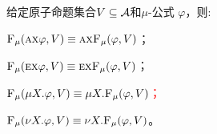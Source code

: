 \begin{proposition}[同质性]\label{chapter06:pro:mu:forget:2}
	给定原子命题集合$V\subseteq\cal A$和$\mu$-公式 $\varphi$，则: %
	\begin{itemize}
		\item[(i)] ${\textsc{F}_{\textsc{$\mu$}}}(\textsc{a}\textsc{x}\varphi,V)\equiv \textsc{a}\textsc{x} {\textsc{F}_{\textsc{$\mu$}}}(\varphi,V)$；
		\item[(ii)] ${\textsc{F}_{\textsc{$\mu$}}}(\textsc{e}\textsc{x}\varphi,V)\equiv\textsc{e}\textsc{x} {\textsc{F}_{\textsc{$\mu$}}}(\varphi,V)$；
		\textcolor{red}{\item[(iii)] ${\textsc{F}_{\textsc{$\mu$}}}(\mu X. \varphi, V) \equiv \mu X. {\textsc{F}_{\textsc{$\mu$}}}(\varphi, V)$；}
		\item[(iv)] ${\textsc{F}_{\textsc{$\mu$}}}(\nu X. \varphi, V) \equiv \nu X. {\textsc{F}_{\textsc{$\mu$}}}(\varphi, V)$。
	\end{itemize}
\end{proposition}
